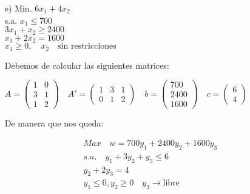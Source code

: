 \begin{itemize}
    \item[e)] Min. \quad $6x_1 + 4x_2$ \\
    s.a. \quad $x_1 \leq 700$ \\
    \quad \quad $3x_1 + x_2 \geq 2400$ \\
    \quad \quad $x_1 + 2x_2 = 1600$ \\
    \quad \quad $x_1 \geq 0, \quad x_2 \quad \text{sin restricciones}$

    Debemos de calcular las siguientes matrices:

    $ A =
    \begin{pmatrix}
        1 & 0 \\
        3 & 1 \\
        1 & 2
    \end{pmatrix} \quad
    A' = \begin{pmatrix}
        1 & 3 & 1 \\
        0 & 1 & 2
    \end{pmatrix}
    \quad b = \begin{pmatrix}
        700 \\
        2400 \\
        1600
    \end{pmatrix} \quad c = \begin{pmatrix}
        6 \\
        4
    \end{pmatrix}
    $       

    De manera que nos queda:

    \begin{align*}
        Max \quad w = 700y_1 + 2400y_2 + 1600y_3 \\
        s.a. \quad y_1 + 3y_2 + y_3 \leq 6 \\
        y_2 + 2y_3 = 4 \\
        y_1\leq0 , y_2 \geq 0 \quad y_3 \rightarrow \text{libre}
    \end{align*}
\end{itemize}
